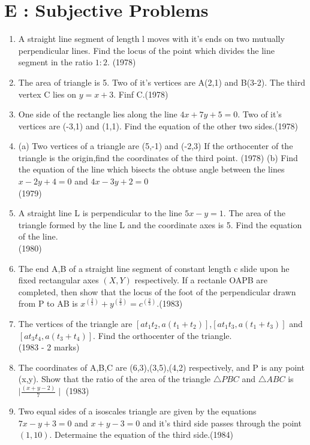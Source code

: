 \documentclass[12pt]{article}
\begin{document}
\section*{E  :  Subjective Problems}

\begin{enumerate}
\item  A straight line segment of length l moves with it's ends on two mutually perpendicular lines. Find the locus of the point which divides the line segment in the ratio $1:2$. (1978)
\item The area of triangle is 5. Two of it's vertices are A(2,1) and B(3-2). The third vertex C lies on $y=x+3$. Finf C.(1978)
\item One side of the rectangle lies along the line $4x+7y+5=0$. Two of it's vertices are (-3,1) and (1,1). Find the equation of the other two sides.(1978)
\item(a) Two vertices of a triangle are (5,-1) and (-2,3) If the orthocenter of the triangle is the origin,find the coordinates of the third point. (1978)
(b) Find the equation of the line which bisects the obtuse angle between the lines $x-2y+4=0$ and $4x-3y+2=0$\\ (1979)
\item  A straight line L is perpendicular to the line $5x-y=1$. The area of the triangle formed by the line L and the coordinate axes is 5. Find the equation of the line.\\ (1980)
\item The end A,B of a straight line segment of constant length c slide upon he fixed rectangular axes $(X,Y)$ respectively. If a rectanle OAPB are completed, then show that the locus of the foot of the perpendicular drawn from P to AB is $x^(\frac{2}{3})+y^(\frac{2}{3})=c^(\frac{2}{3})$.(1983)\\
\item The vertices of the triangle are $[at_1t_2,a(t_1+t_2)]$,$[at_1t_3,a(t_1+t_3)]$ and $[at_3t_4,a(t_3+t_4)]$. Find the orthocenter of the triangle.\\ (1983 - 2 marks)
\item The coordinates of A,B,C are  (6,3),(3,5),(4,2) respectively, and P is any point (x,y). Show that the ratio of the area of the triangle $\triangle PBC$ and $\triangle ABC $ is $\mid\frac{(x+y-2)}{7}\mid$ (1983)\\
\item Two equal sides of a isoscales triangle are given by the equations $7x-y+3=0$ and $x+y-3=0$ and it's third side passes through the point $(1,10)$. Determaine the equation of the third side.(1984)\\

\end{enumerate}
\end{document}
